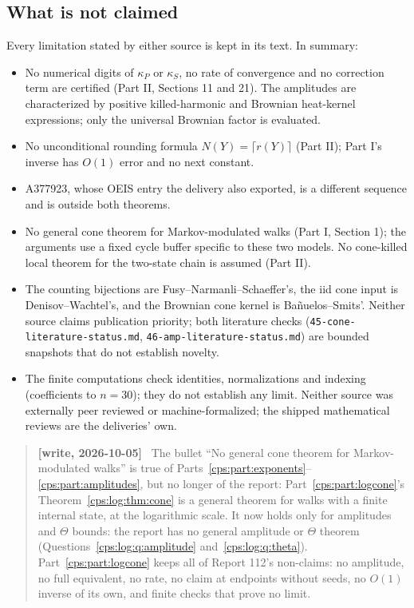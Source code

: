 \documentclass[11pt,letterpaper]{article}
\numberwithin{equation}{section}
\theoremstyle{remark}\newtheorem{remark}[theorem]{Remark}
\newenvironment{writenotelog}{\begin{quote}\small\sloppy\textbf{[write, 2026-10-05]}\ }{\end{quote}}
\begin{document}
\subsection*{What is not claimed}
Every limitation stated by either source is kept in its text. In summary:
\begin{itemize}
\item No numerical digits of $\kappa_P$ or $\kappa_S$, no rate of convergence and no correction
 term are certified (Part II, Sections 11 and 21). The amplitudes are characterized by positive
 killed-harmonic and Brownian heat-kernel expressions; only the universal Brownian factor is
 evaluated.
\item No unconditional rounding formula $N(Y)=\lceil r(Y)\rceil$ (Part II); Part I's inverse has
 $O(1)$ error and no next constant.
\item A377923, whose OEIS entry the delivery also exported, is a different sequence and is
 outside both theorems.
\item No general cone theorem for Markov-modulated walks (Part I, Section 1); the arguments use a
 fixed cycle buffer specific to these two models. No cone-killed local theorem for the two-state
 chain is assumed (Part II).
\item The counting bijections are Fusy--Narmanli--Schaeffer's, the iid cone input is
 Denisov--Wachtel's, and the Brownian cone kernel is Ba\~nuelos--Smits'. Neither source claims
 publication priority; both literature checks (\texttt{45-cone-literature-status.md},
 \texttt{46-amp-literature-status.md}) are bounded snapshots that do not establish novelty.
\item The finite computations check identities, normalizations and indexing (coefficients to
 $n=30$); they do not establish any limit. Neither source was externally peer reviewed or
 machine-formalized; the shipped mathematical reviews are the deliveries' own.
\end{itemize}

\begin{writenotelog}
The bullet ``No general cone theorem for Markov-modulated walks'' is true of
Parts~\ref{cps:part:exponents}--\ref{cps:part:amplitudes}, but no longer of the report:
Part~\ref{cps:part:logcone}'s Theorem~\ref{cps:log:thm:cone} is a general theorem for walks with a
finite internal state, at the logarithmic scale. It now holds only for amplitudes and $\Theta$
bounds: the report has no general amplitude or $\Theta$ theorem (Questions~\ref{cps:log:q:amplitude}
and~\ref{cps:log:q:theta}). Part~\ref{cps:part:logcone} keeps all of Report 112's non-claims: no
amplitude, no full equivalent, no rate, no claim at endpoints without seeds, no $O(1)$ inverse of
its own, and finite checks that prove no limit.
\end{writenotelog}
\end{document}
